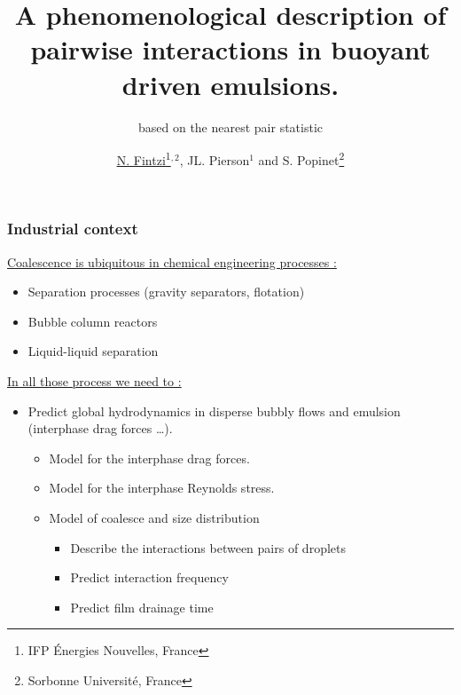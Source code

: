 \documentclass{sintefbeamer}
\title{A phenomenological description of pairwise interactions in buoyant driven emulsions.}
\subtitle{based on the nearest pair statistic}
\author{\href{http://basilisk.fr/sandbox/fintzin/Rising-Suspenion/RS.c}{\underline{N. Fintzi}\footnote{IFP \'Energies Nouvelles, France}$^{,2}$}, JL. Pierson$^1$ and S. Popinet\footnote{Sorbonne Universit\'e, France}}
\begin{document}
\maketitle

\begin{frame}
  \frametitle{Industrial context}
  \underline{Coalescence is ubiquitous in chemical engineering processes :}
  \begin{itemize}
    \item Separation processes (gravity separators, flotation)
    \item Bubble column reactors
    \item Liquid-liquid separation
  \end{itemize}
  \vfill
  \underline{In all those process we need to : }
  \begin{itemize}
    \item Predict global hydrodynamics in disperse bubbly flows and emulsion (interphase drag forces \ldots).
    \begin{itemize}
      \item Model for the interphase drag forces.
      \item Model for the interphase Reynolds stress.
      \item Model of coalesce and size distribution 
      \begin{itemize}
        \item Describe the interactions between pairs of droplets
        \item Predict interaction frequency
        \item Predict film drainage time 
      \end{itemize}
    \end{itemize}
  \end{itemize}

  \vfill
\end{frame}


  

\end{document}
